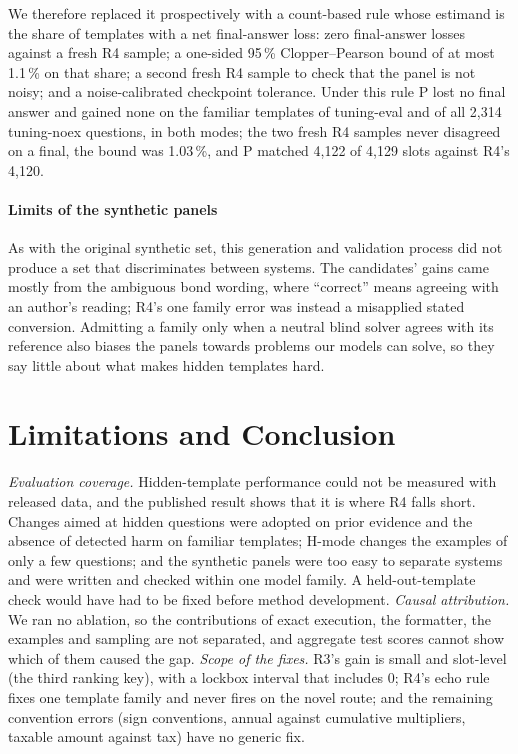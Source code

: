 \documentclass[conference]{IEEEtran}
\begin{document}
We therefore replaced it prospectively with a count-based rule whose estimand is the share of templates with a net final-answer loss: zero final-answer losses against a fresh R4 sample; a one-sided 95\,\% Clopper--Pearson bound of at most 1.1\,\% on that share; a second fresh R4 sample to check that the panel is not noisy; and a noise-calibrated checkpoint tolerance. Under this rule P lost no final answer and gained none on the familiar templates of tuning-eval and of all 2,314 tuning-noex questions, in both modes; the two fresh R4 samples never disagreed on a final, the bound was 1.03\,\%, and P matched 4,122 of 4,129 slots against R4's 4,120.

\paragraph*{Limits of the synthetic panels} As with the original synthetic set, this generation and validation process did not produce a set that discriminates between systems. The candidates' gains came mostly from the ambiguous bond wording, where ``correct'' means agreeing with an author's reading; R4's one family error was instead a misapplied stated conversion. Admitting a family only when a neutral blind solver agrees with its reference also biases the panels towards problems our models can solve, so they say little about what makes hidden templates hard.

\section{Limitations and Conclusion}
\emph{Evaluation coverage.} Hidden-template performance could not be measured with released data, and the published result shows that it is where R4 falls short. Changes aimed at hidden questions were adopted on prior evidence and the absence of detected harm on familiar templates; H-mode changes the examples of only a few questions; and the synthetic panels were too easy to separate systems and were written and checked within one model family. A held-out-template check would have had to be fixed before method development. \emph{Causal attribution.} We ran no ablation, so the contributions of exact execution, the formatter, the examples and sampling are not separated, and aggregate test scores cannot show which of them caused the gap. \emph{Scope of the fixes.} R3's gain is small and slot-level (the third ranking key), with a lockbox interval that includes 0; R4's echo rule fixes one template family and never fires on the novel route; and the remaining convention errors (sign conventions, annual against cumulative multipliers, taxable amount against tax) have no generic fix.
\end{document}
